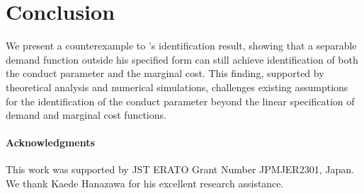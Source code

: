 \documentclass[11pt, a4paper]{article}
\theoremstyle{remark}
\begin{document}
\section{Conclusion}

We present a counterexample to \citet{lau1982identifying}'s identification result, showing that a separable demand function outside his specified form can still achieve identification of both the conduct parameter and the marginal cost. This finding, supported by theoretical analysis and numerical simulations, challenges existing assumptions for the identification of the conduct parameter beyond the linear specification of demand and marginal cost functions.

\paragraph{Acknowledgments}
This work was supported by JST ERATO Grant Number JPMJER2301, Japan. We thank Kaede Hanazawa for his excellent research assistance.



\end{document}
